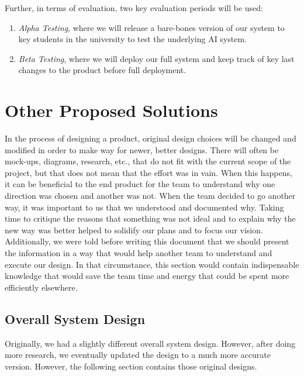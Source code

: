 \documentclass[titlepage, 12pt]{article}
\begin{document}
Further, in terms of evaluation, two key evaluation periods will be used:

\begin{enumerate}
    \item \emph{Alpha Testing}, where we will release a bare-bones version of our system to key students in the university to test the underlying AI system.
    \item \emph{Beta Testing}, where we will deploy our full system and keep track of key last changes to the product before full deployment.
\end{enumerate}

\pagebreak








\section{Other Proposed Solutions}

In the process of designing a product, original design choices will be changed and modified in order to make way for newer, better designs. There will often be mock-ups, diagrams, research, etc., that do not fit with the current scope of the project, but that does not mean that the effort was in vain. When this happens, it can be beneficial to the end product for the team to understand why one direction was chosen and another was not. When the team decided to go another way, it was important to us that we understood and documented why. Taking time to critique the reasons that something was not ideal and to explain why the new way was better helped to solidify our plans and to focus our vision. Additionally, we were told before writing this document that we should present the information in a way that would help another team to understand and execute our design. In that circumstance, this section would contain indispensable knowledge that would save the team time and energy that could be spent more efficiently elsewhere.

\subsection{Overall System Design}

Originally, we had a slightly different overall system design. However, after doing more research, we eventually updated the design to a much more accurate version. However, the following section contains those original designs.
\end{document}
